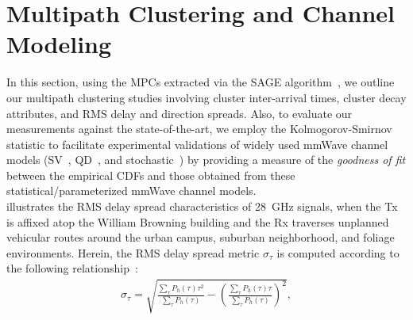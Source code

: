 \documentclass[10pt, twocolumn]{IEEEtran}
\begin{document}
{\section{Multipath Clustering and Channel Modeling}\label{S5}
In this section, using the MPCs extracted via the SAGE algorithm~\cite{SAGE}, we outline our multipath clustering studies involving cluster inter-arrival times, cluster decay attributes, and RMS delay and direction spreads. Also, to evaluate our measurements against the state-of-the-art, we employ the Kolmogorov-Smirnov statistic to facilitate experimental validations of widely used mmWave channel models (SV~\cite{SV_Molisch}, QD~\cite{QDC_NIST}, and stochastic~\cite{Indoor60G}) by providing a measure of the \emph{goodness of fit} between the empirical CDFs and those obtained from these statistical/parameterized mmWave channel models.\\
 illustrates the RMS delay spread characteristics of \SI{28}{\giga\hertz} signals, when the Tx is affixed atop the William Browning building and the Rx traverses unplanned vehicular routes around the urban campus, suburban neighborhood, and foliage environments. Herein, the RMS delay spread metric $\sigma_{\tau}$ is computed according to the following relationship~\cite{Indoor60G}:
\vspace{2.02mm}
\begin{align}\label{RMS_DS}
    \sigma_{\tau} = \sqrt{\frac{\sum_{\tau}P_{h}(\tau)\tau^{2}}{\sum_{\tau}P_{h}(\tau)} - \left(\frac{\sum_{\tau}P_{h}(\tau)\tau}{\sum_{\tau}P_{h}(\tau)}\right)^{2}},
\end{align}
}
\end{document}
